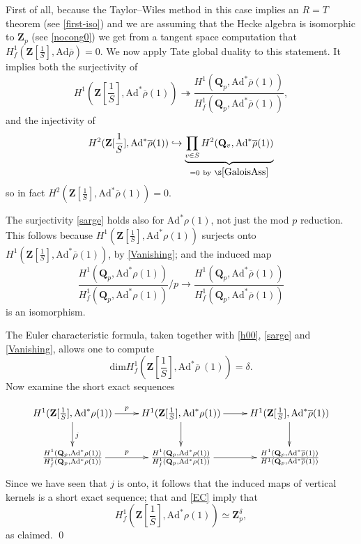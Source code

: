 \documentclass[10pt]{amsart}
\newcommand{\Z}{\mathbf{Z}}
\newcommand{\Ad}{\mathrm{Ad}}
\newcommand{\rhobar}{\overline{\rho}}
\renewcommand{\dim}{\mathrm{dim}}
\newcommand{\Q}{\mathbf{Q}}
\newcommand{\ramprimes}{S}
\theoremstyle{remark}
\begin{document}
 First of all, because the Taylor--Wiles method in this case implies an $R=T$ theorem (see \eqref{first-iso})
 and  we are assuming   that the Hecke algebra is isomorphic to $\Z_p$  (see \eqref{nocong0}) we get from a tangent space computation that
 $H^1_f ( \Z[\frac{1}{\ramprimes}], \Ad \rhobar ) = 0.$
 We now apply Tate global duality to this statement. It implies  both the surjectivity of
\begin{equation} \label{sarge} H^1(\Z[\frac{1}{\ramprimes}], \Ad ^*  \rhobar(1)) \twoheadrightarrow \frac{ H^1(\Q_p, \Ad^* \rhobar (1)) }{ H^1_f(\Q_p, \Ad^* \rhobar (1)) }, \end{equation}
and  the injectivity  of
\begin{equation} \label{Vanishing} H^2(\Z[\frac{1}{\ramprimes}],\Ad^* \rhobar(1))  \hookrightarrow \underbrace{ \prod_{v \in \ramprimes} H^2(\Q_v, \Ad^* \rhobar(1)) }_{=0 \mathrm{  \ by  \ \S \ref{GaloisAss}}} \end{equation}
  so in fact $ H^2(\Z[\frac{1}{\ramprimes}],\Ad^* \rhobar(1))=0$. 
 

The surjectivity \eqref{sarge} holds also for $\Ad^* \rho(1)$, not just the mod $p$ reduction.
This follows because $H^1(\Z[\frac{1}{\ramprimes}], \Ad^* \rho(1))$ surjects onto  $H^1(\Z[\frac{1}{\ramprimes}], \Ad^* \rhobar(1))$, by \eqref{Vanishing};
and the induced map
$$\frac{ H^1(\Q_p, \Ad^* \rho (1)) }{ H^1_f(\Q_p, \Ad^* \rho (1)) }/p  \rightarrow \frac{ H^1(\Q_p, \Ad^* \rhobar (1)) }{ H^1_f(\Q_p, \Ad^* \rhobar (1)) } $$
is an isomorphism. 
%
%


 
 
The Euler characteristic formula, taken together with \eqref{h00}, \eqref{sarge} and \eqref{Vanishing}, allows one to compute  \begin{equation}
\label{EC} \dim H^1_f(\Z[\frac{1}{\ramprimes}], \Ad^* \rhobar \ (1)) = \delta.\end{equation}
Now examine  the short exact sequences  
 
 \begin{equation} \label{feeling_groovy1}
 \xymatrix{
H^1(\Z[\frac{1}{\ramprimes}], \Ad^*  \rho (1)) \ar[r]^{p}\ar[d]^j   & H^1(\Z[\frac{1}{\ramprimes}], \Ad^* \rho  (1))\ar[d]   \ar[r]  &H^1(\Z[\frac{1}{\ramprimes}], \Ad^* \rhobar (1))   \ar[d] \\
\frac{H^1(\Q_p,\Ad^* \rho (1))}{H^1_f (\Q_p, \Ad^* \rho(1))} \ar[r]^{p}   & \frac{H^1(\Q_p,\Ad^* \rho  (1))}{H^1_f(\Q_p,\Ad^* \rho  (1))} \ar[r] &\frac{H^1(\Q_p,\Ad^* \rhobar (1))}{H^1(\Q_p,\Ad^* \rhobar (1))} \\
 }
 \end{equation} 
 Since we have seen that $j$ is onto, 
 it follows that the induced maps of vertical kernels is a short exact sequence;
that and \eqref{EC} imply that
 $$ H^1_f(\Z[\frac{1}{\ramprimes}], \Ad^* \rho(1)) \simeq \Z_p^{\delta},$$
 as claimed. 
   \qed 
 
\end{document}
